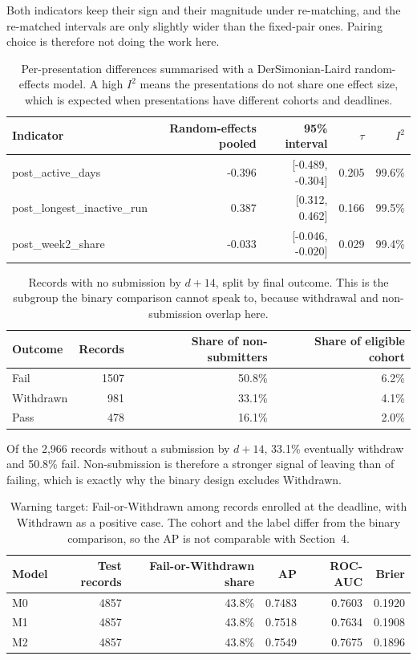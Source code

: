 \documentclass[11pt]{article}
\begin{document}
Both indicators keep their sign and their magnitude under re-matching, and the re-matched intervals are only slightly wider than the fixed-pair ones. Pairing choice is therefore not doing the work here.
\begin{table}[t]
\centering
\footnotesize
\begin{tabular}{lrrrr}
\toprule
Indicator & Random-effects pooled & 95\% interval & $\tau$ & $I^2$ \\
\midrule
post\_active\_days & -0.396 & [-0.489, -0.304] & 0.205 & 99.6\% \\
post\_longest\_inactive\_run & 0.387 & [0.312, 0.462] & 0.166 & 99.5\% \\
post\_week2\_share & -0.033 & [-0.046, -0.020] & 0.029 & 99.4\% \\
\bottomrule
\end{tabular}
\caption{Per-presentation differences summarised with a DerSimonian-Laird random-effects model. A high $I^2$ means the presentations do not share one effect size, which is expected when presentations have different cohorts and deadlines.}
\label{tab:c2b}
\end{table}
\begin{table}[t]
\centering
\footnotesize
\begin{tabular}{lrrr}
\toprule
Outcome & Records & Share of non-submitters & Share of eligible cohort \\
\midrule
Fail & 1507 & 50.8\% & 6.2\% \\
Withdrawn & 981 & 33.1\% & 4.1\% \\
Pass & 478 & 16.1\% & 2.0\% \\
\bottomrule
\end{tabular}
\caption{Records with no submission by $d+14$, split by final outcome. This is the subgroup the binary comparison cannot speak to, because withdrawal and non-submission overlap here.}
\label{tab:c3}
\end{table}
Of the 2,966 records without a submission by $d+14$, 33.1\% eventually withdraw and 50.8\% fail. Non-submission is therefore a stronger signal of leaving than of failing, which is exactly why the binary design excludes Withdrawn.
\begin{table}[t]
\centering
\footnotesize
\begin{tabular}{lrrrrr}
\toprule
Model & Test records & Fail-or-Withdrawn share & AP & ROC-AUC & Brier \\
\midrule
M0 & 4857 & 43.8\% & 0.7483 & 0.7603 & 0.1920 \\
M1 & 4857 & 43.8\% & 0.7518 & 0.7634 & 0.1908 \\
M2 & 4857 & 43.8\% & 0.7549 & 0.7675 & 0.1896 \\
\bottomrule
\end{tabular}
\caption{Warning target: Fail-or-Withdrawn among records enrolled at the deadline, with Withdrawn as a positive case. The cohort and the label differ from the binary comparison, so the AP is not comparable with Section~4.}
\label{tab:c4}
\end{table}
\end{document}
